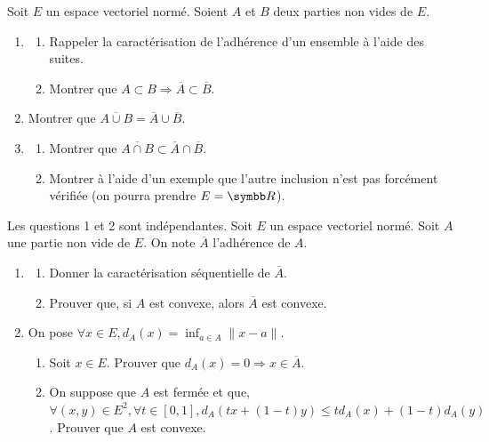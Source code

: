 \begin{exercice}
    Soit $E$ un espace vectoriel normé. Soient $A$ et $B$ deux parties non vides de $E$.
    \begin{enumerate}
        \item 
        \begin{enumerate}
            \item Rappeler la caractérisation de l'adhérence d'un ensemble à l'aide des suites.
            \item Montrer que $A \subset B \Rightarrow \overline{A} \subset \overline{B}$.
        \end{enumerate}
        \item Montrer que $\overline{A \cup B} = \overline{A} \cup \overline{B}$.
        \item 
        \begin{enumerate}
            \item Montrer que $\overline{A \cap B} \subset \overline{A} \cap \overline{B}$.
            \item Montrer à l'aide d'un exemple que l'autre inclusion n'est pas forcément vérifiée (on pourra prendre $E=\R$).
        \end{enumerate}
    \end{enumerate}
\end{exercice}

\begin{exercice}
    Les questions 1 et 2 sont indépendantes. Soit $E$ un espace vectoriel normé. 
    Soit $A$ une partie non vide de $E$. On note $\overline{A}$ l'adhérence de $A$.
    \begin{enumerate}
        \item 
        \begin{enumerate}
            \item Donner la caractérisation séquentielle de $\overline{A}$.
            \item Prouver que, si $A$ est convexe, alors $\overline{A}$ est convexe.
        \end{enumerate}
        \item On pose $\forall x \in E, d_{A}(x) = \inf_{a \in A} \|x-a\|$.
        \begin{enumerate}
            \item Soit $x \in E$. Prouver que $d_{A}(x) = 0 \Rightarrow x \in \overline{A}$.
            \item On suppose que $A$ est fermée et que, $\forall (x,y) \in E^{2}, \forall t \in [0,1], d_{A}(tx+(1-t)y) \leqslant t d_{A}(x) + (1-t) d_{A}(y)$. 
                Prouver que $A$ est convexe.
        \end{enumerate}
    \end{enumerate}
\end{exercice}

